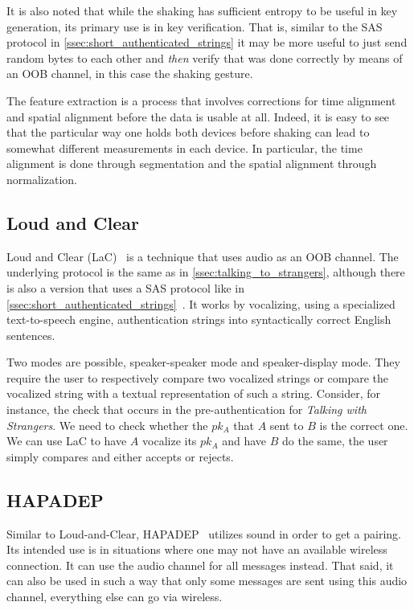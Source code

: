 \documentclass[conference, 11pt]{sty/IEEEtran}
\begin{document}
It is also noted that while the shaking has sufficient entropy to be useful in key generation, its primary use is in key verification.
That is, similar to the SAS protocol in \autoref{ssec:short_authenticated_strings} it may be more useful to just send random bytes to each other and \emph{then} verify that was done correctly by means of an OOB channel, in this case the shaking gesture.

The feature extraction is a process that involves corrections for time alignment and spatial alignment before the data is usable at all.
Indeed, it is easy to see that the particular way one holds both devices before shaking can lead to somewhat different measurements in each device.
In particular, the time alignment is done through segmentation and the spatial alignment through normalization.

\subsection{Loud and Clear}
\label{ssec:loud_and_clear}

Loud and Clear (LaC)~\cite{goodrich2006loud} is a technique that uses audio as an OOB channel.
The underlying protocol is the same as in \autoref{ssec:talking_to_strangers}, although there is also a version that uses a SAS protocol like in \autoref{ssec:short_authenticated_strings}~\cite{kumar2009comparative}.
It works by vocalizing, using a specialized text-to-speech engine, authentication strings into syntactically correct English sentences.

Two modes are possible, speaker-speaker mode and speaker-display mode.
They require the user to respectively compare two vocalized strings or compare the vocalized string with a textual representation of such a string.
Consider, for instance, the check that occurs in the pre-authentication for \emph{Talking with Strangers}.
We need to check whether the $pk_A$ that $A$ sent to $B$ is the correct one.
We can use LaC to have $A$ vocalize its $pk_A$ and have $B$ do the same, the user simply compares and either accepts or rejects.

\subsection{HAPADEP}
\label{ssec:hapadep}

Similar to Loud-and-Clear, HAPADEP~\cite{soriente2008hapadep} utilizes sound in order to get a pairing.
Its intended use is in situations where one may not have an available wireless connection.
It can use the audio channel for all messages instead.
That said, it can also be used in such a way that only some messages are sent using this audio channel, everything else can go via wireless.
\end{document}
